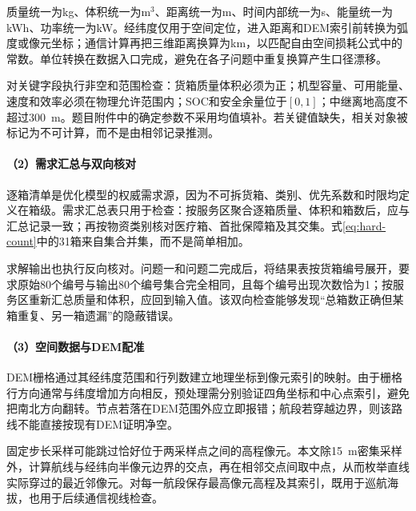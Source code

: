质量统一为kg、体积统一为m$^3$、距离统一为m、时间内部统一为s、能量统一为kWh、功率统一为kW。经纬度仅用于空间定位，进入距离和DEM索引前转换为弧度或像元坐标；通信计算再把三维距离换算为km，以匹配自由空间损耗公式中的常数。单位转换在数据入口完成，避免在各子问题中重复换算产生口径漂移。

对关键字段执行非空和范围检查：货箱质量体积必须为正；机型容量、可用能量、速度和效率必须在物理允许范围内；SOC和安全余量位于$[0,1]$；中继离地高度不超过300~m。题目附件中的确定参数不采用均值填补。若关键值缺失，相关对象被标记为不可计算，而不是由相邻记录推测。

\paragraph{（2）需求汇总与双向核对}
逐箱清单是优化模型的权威需求源，因为不可拆货箱、类别、优先系数和时限均定义在箱级。需求汇总表只用于检查：按服务区聚合逐箱质量、体积和箱数后，应与汇总记录一致；再按物资类别核对医疗箱、首批保障箱及其交集。式\eqref{eq:hard-count}中的31箱来自集合并集，而不是简单相加。

求解输出也执行反向核对。问题一和问题二完成后，将结果表按货箱编号展开，要求原始80个编号与输出80个编号集合完全相同，且每个编号出现次数恰为1；按服务区重新汇总质量和体积，应回到输入值。该双向检查能够发现“总箱数正确但某箱重复、另一箱遗漏”的隐蔽错误。

\paragraph{（3）空间数据与DEM配准}
DEM栅格通过其经纬度范围和行列数建立地理坐标到像元索引的映射。由于栅格行方向通常与纬度增加方向相反，预处理需分别验证四角坐标和中心点索引，避免把南北方向翻转。节点若落在DEM范围外应立即报错；航段若穿越边界，则该路线不能直接按现有DEM证明净空。

固定步长采样可能跳过恰好位于两采样点之间的高程像元。本文除15~m密集采样外，计算航线与经纬向半像元边界的交点，再在相邻交点间取中点，从而枚举直线实际穿过的最近邻像元。对每一航段保存最高像元高程及其索引，既用于巡航海拔，也用于后续通信视线检查。

